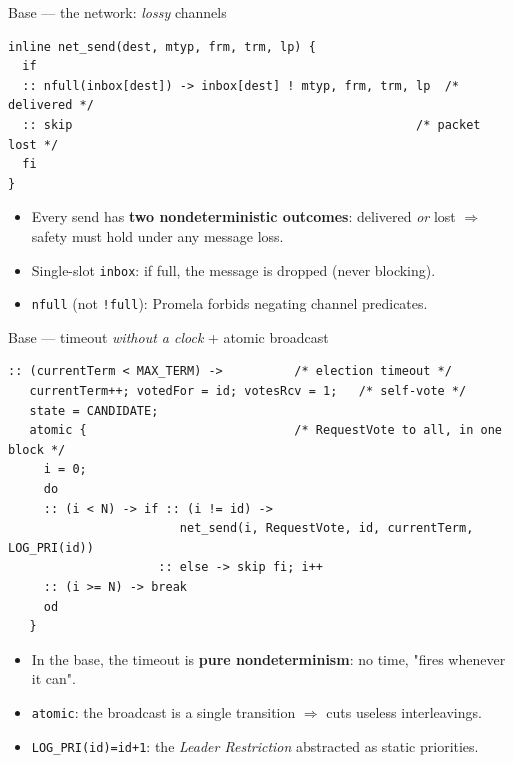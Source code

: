 \documentclass{beamer}
\begin{document}
\begin{frame}[fragile]{Base — the network: \emph{lossy} channels}
\begin{lstlisting}[style=promela]
inline net_send(dest, mtyp, frm, trm, lp) {
  if
  :: nfull(inbox[dest]) -> inbox[dest] ! mtyp, frm, trm, lp  /* delivered */
  :: skip                                                /* packet lost */
  fi
}
\end{lstlisting}
  \begin{itemize}
    \item Every send has \textbf{two nondeterministic outcomes}: delivered \emph{or} lost
          $\Rightarrow$ safety must hold under any message loss.
    \item Single-slot \texttt{inbox}: if full, the message is dropped (never blocking).
    \item \texttt{nfull} (not \texttt{!full}): Promela forbids negating channel predicates.
  \end{itemize}
\end{frame}

\begin{frame}[fragile]{Base — timeout \emph{without a clock} + atomic broadcast}
\begin{lstlisting}[style=promela]
:: (currentTerm < MAX_TERM) ->          /* election timeout */
   currentTerm++; votedFor = id; votesRcv = 1;   /* self-vote */
   state = CANDIDATE;
   atomic {                             /* RequestVote to all, in one block */
     i = 0;
     do
     :: (i < N) -> if :: (i != id) ->
                        net_send(i, RequestVote, id, currentTerm, LOG_PRI(id))
                     :: else -> skip fi; i++
     :: (i >= N) -> break
     od
   }
\end{lstlisting}
  \begin{itemize}
    \item In the base, the timeout is \textbf{pure nondeterminism}: no time, "fires whenever it can".
    \item \texttt{atomic}: the broadcast is a single transition $\Rightarrow$ cuts useless interleavings.
    \item \texttt{LOG\_PRI(id)=id+1}: the \emph{Leader Restriction} abstracted as static priorities.
  \end{itemize}
\end{frame}
\end{document}
